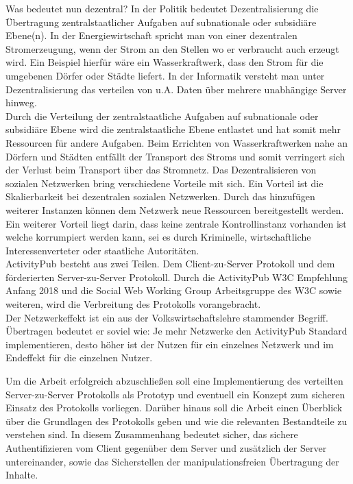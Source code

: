 {	Was bedeutet nun dezentral? In der Politik bedeutet Dezentralisierung \glqq die Übertragung zentralstaatlicher Aufgaben auf subnationale oder subsidiäre Ebene(n)\grqq\cite{wikipedia-dezentralisierung-politik}. In der Energiewirtschaft spricht man von einer \glqq dezentralen Stromerzeugung\grqq, wenn der Strom an den Stellen wo er verbraucht auch erzeugt wird. Ein Beispiel hierfür wäre ein Wasserkraftwerk, dass den Strom für die umgebenen Dörfer oder Städte liefert\cite{wikipedia-dezentralisierung-energie}. In der Informatik versteht man unter Dezentralisierung das verteilen von u.A. Daten über mehrere unabhängige Server hinweg.\\
	
	Durch die Verteilung der zentralstaatliche Aufgaben auf subnationale oder subsidiäre Ebene wird die zentralstaatliche Ebene entlastet und hat somit mehr Ressourcen für andere Aufgaben. Beim Errichten von Wasserkraftwerken nahe an Dörfern und Städten entfällt der Transport des Stroms und somit verringert sich der Verlust beim Transport über das Stromnetz. Das Dezentralisieren von sozialen Netzwerken bring verschiedene Vorteile mit sich. Ein Vorteil ist die Skalierbarkeit bei dezentralen sozialen Netzwerken. Durch das hinzufügen weiterer Instanzen können dem Netzwerk neue Ressourcen bereitgestellt werden. Ein weiterer Vorteil liegt darin, dass keine zentrale Kontrollinstanz vorhanden ist welche korrumpiert werden kann, sei es durch Kriminelle, wirtschaftliche Interessenverteter oder staatliche Autoritäten.\\
		
	ActivityPub besteht aus zwei Teilen. Dem Client-zu-Server Protokoll und dem förderierten Server-zu-Server Protokoll. Durch die ActivityPub W3C Empfehlung Anfang 2018 und die Social Web Working Group Arbeitsgruppe des W3C sowie weiteren, wird die Verbreitung des Protokolls vorangebracht.\\
	
	Der Netzwerkeffekt ist ein aus der Volkswirtschaftslehre stammender Begriff. Übertragen bedeutet er soviel wie: \glqq Je mehr Netzwerke den ActivityPub Standard implementieren, desto höher ist der Nutzen für ein einzelnes Netzwerk und im Endeffekt für die einzelnen Nutzer\grqq.\\
		
	Um die Arbeit erfolgreich abzuschließen soll eine Implementierung des verteilten Server-zu-Server Protokolls als Prototyp und eventuell ein Konzept zum sicheren Einsatz des Protokolls vorliegen. Darüber hinaus soll die Arbeit einen Überblick über die Grundlagen des Protokolls geben und wie die relevanten Bestandteile zu verstehen sind. In diesem Zusammenhang bedeutet \glqq sicher\grqq, das sichere Authentifizieren vom Client gegenüber dem Server und zusätzlich der Server untereinander, sowie das Sicherstellen der manipulationsfreien Übertragung der Inhalte.
	
}
